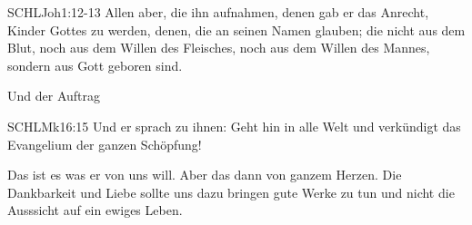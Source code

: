\documentclass[14pt]{../../inc/mybib}
\begin{document}
    \begin{bibelbox}{SCHL}{Joh}{1:12-13}
        Allen aber, die ihn aufnahmen, denen gab er das Anrecht, Kinder Gottes zu werden, denen, die an seinen Namen glauben;
        die nicht aus dem Blut, noch aus dem Willen des Fleisches, noch aus dem Willen des Mannes, sondern aus Gott geboren sind.
    \end{bibelbox}     
    Und der Auftrag
    \begin{bibelbox}{SCHL}{Mk}{16:15}
        Und er sprach zu ihnen: Geht hin in alle Welt und verkündigt das Evangelium der ganzen Schöpfung!
    \end{bibelbox} 
    Das ist es was er von uns will. Aber das dann von ganzem Herzen. Die Dankbarkeit und Liebe sollte uns dazu bringen gute Werke zu tun und nicht die Ausssicht auf ein ewiges Leben.
    
    \beten{}

    
    
\end{document}
